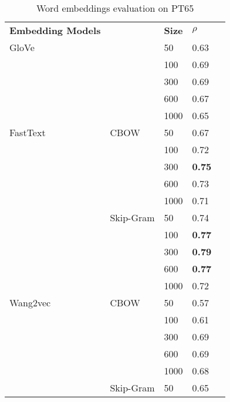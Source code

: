 \begin{table}[]
\caption{Word embeddings evaluation on PT65}
\label{tab:estacoes}
\centering%
\begin{minipage}{.5\textwidth}
\begin{tabular}{@{}lllll@{}}
\cmidrule(r){1-4}
\textbf{Embedding Models} &      & \textbf{Size} & \textbf{$\rho$} \\ \cmidrule(r){1-4}
GloVe            &               & 50   & 0.63             \\
                 &               & 100  & 0.69             \\
                 &               & 300  & 0.69             \\
                 &               & 600  & 0.67             \\
                 &               & 1000 & 0.65             \\ \cmidrule(r){1-4}
FastText         & CBOW          & 50   & 0.67             \\
                 &               & 100  & 0.72             \\
                 &               & 300  & \textbf{0.75}    \\
                 &               & 600  & 0.73             \\
                 &               & 1000 & 0.71             \\ \cmidrule(lr){2-4}
                 & Skip-Gram     & 50   & 0.74             \\
                 &               & 100  & \textbf{0.77}    \\
                 &               & 300  & \textbf{0.79}    \\
                 &               & 600  & \textbf{0.77}    \\
                 &               & 1000 & 0.72             \\ \cmidrule(r){1-4}
Wang2vec         & CBOW          & 50   & 0.57             \\
                 &               & 100  & 0.61             \\
                 &               & 300  & 0.69             \\
                 &               & 600  & 0.69             \\
                 &               & 1000 & 0.68             \\ \cmidrule(lr){2-4}
                 & Skip-Gram     & 50   & 0.65             \\

\end{tabular}
\end{minipage}
\end{table}

